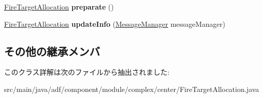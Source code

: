 \begin{DoxyCompactItemize}
\item 
\hypertarget{classadf_1_1component_1_1module_1_1complex_1_1center_1_1FireTargetAllocation_aaeda2936a727f339be1fdde42fa62eb2}{}\label{classadf_1_1component_1_1module_1_1complex_1_1center_1_1FireTargetAllocation_aaeda2936a727f339be1fdde42fa62eb2} 
\hyperlink{classadf_1_1component_1_1module_1_1complex_1_1center_1_1FireTargetAllocation}{Fire\+Target\+Allocation} {\bfseries preparate} ()
\item 
\hypertarget{classadf_1_1component_1_1module_1_1complex_1_1center_1_1FireTargetAllocation_a819a6518ff68f9068a56fb1cf09b4e2c}{}\label{classadf_1_1component_1_1module_1_1complex_1_1center_1_1FireTargetAllocation_a819a6518ff68f9068a56fb1cf09b4e2c} 
\hyperlink{classadf_1_1component_1_1module_1_1complex_1_1center_1_1FireTargetAllocation}{Fire\+Target\+Allocation} {\bfseries update\+Info} (\hyperlink{classadf_1_1agent_1_1communication_1_1MessageManager}{Message\+Manager} message\+Manager)
\end{DoxyCompactItemize}
\subsection*{その他の継承メンバ}


このクラス詳解は次のファイルから抽出されました\+:\begin{DoxyCompactItemize}
\item 
src/main/java/adf/component/module/complex/center/Fire\+Target\+Allocation.\+java\end{DoxyCompactItemize}
